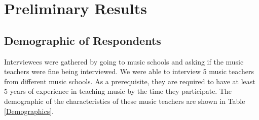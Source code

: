 %
%
%                 
\chapter{Preliminary Results}
\label{sec: preliminary}
\section{Demographic of Respondents}
Interviewees were gathered by going to music schools and asking if the music teachers were fine being interviewed. We were able to interview 5 music teachers from different music schools. As a prerequisite, they are required to have at least 5 years of experience in teaching music by the time they participate. The demographic of the characteristics of these music teachers are shown in Table \ref{Demographics}.

